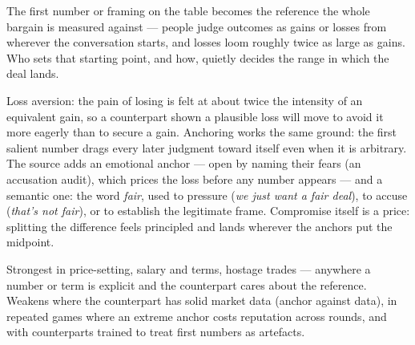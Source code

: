 

\begin{core}
The first number or framing on the table becomes the reference the whole bargain is measured against --- people judge outcomes as gains or losses from wherever the conversation starts, and losses loom roughly twice as large as gains. Who sets that starting point, and how, quietly decides the range in which the deal lands.
\end{core}
\begin{mechanism}
Loss aversion: the pain of losing is felt at about twice the intensity of an equivalent gain, so a counterpart shown a plausible loss will move to avoid it more eagerly than to secure a gain. Anchoring works the same ground: the first salient number drags every later judgment toward itself even when it is arbitrary. The source adds an emotional anchor --- open by naming their fears (an accusation audit), which prices the loss before any number appears --- and a semantic one: the word \emph{fair}, used to pressure (\emph{we just want a fair deal}), to accuse (\emph{that's not fair}), or to establish the legitimate frame. Compromise itself is a price: splitting the difference feels principled and lands wherever the anchors put the midpoint.
\end{mechanism}
\begin{conditions}
Strongest in price-setting, salary and terms, hostage trades --- anywhere a number or term is explicit and the counterpart cares about the reference. Weakens where the counterpart has solid market data (anchor against data), in repeated games where an extreme anchor costs reputation across rounds, and with counterparts trained to treat first numbers as artefacts.
\end{conditions}
